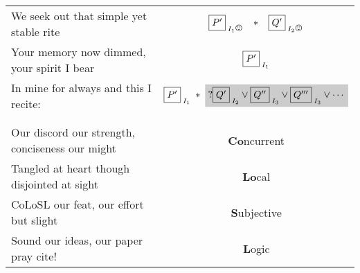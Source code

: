 \documentclass[12pt]{article}
\begin{document}
\begin{tabular}{l @{\hspace*{1cm}} c}
We seek out that simple yet stable rite
&$\shared{P'}{I_1 \smiley{}}  \;\;\; * \;\;\;  \shared{Q'}{I_2 \smiley{}} $\vspace*{2pt}\\

Your memory now dimmed,  your spirit I bear
& $\shared{P'}{I_1}  $\\

In mine for always and this I recite:
&$\shared{P'}{I_1}  \;*\;  \shade{? \shared{Q'}{I_2}\lor \shared{Q''}{I_3}\lor  \shared{Q'''}{I_3} \lor \cdots} $\\

%
\\\\



Our discord our strength, conciseness our might
&\textbf{Co}ncurrent\vspace*{4pt}\\

Tangled at heart though disjointed at sight
&\textbf{Lo}cal\hspace*{28pt}\vspace*{4pt}\\

CoLoSL our feat, our effort but slight
&\textbf{S}ubjective\hspace*{3pt}\vspace*{4pt}\\

Sound our ideas, our paper pray cite! & \textbf{L}ogic\hspace*{28pt}


\end{tabular}
\end{document}
